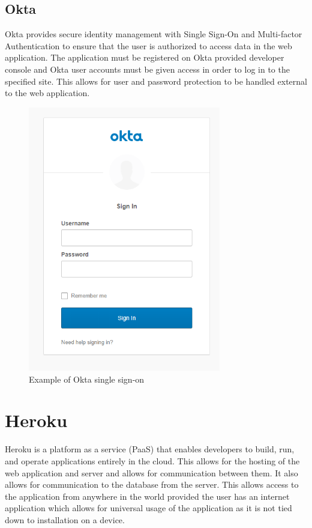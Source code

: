 \subsection{Okta}
Okta provides secure identity management with Single Sign-On and Multi-factor Authentication to ensure that the user is authorized to access data in the web application. The application must be registered on Okta provided developer console and Okta user accounts must be given access in order to log in to the specified site. This allows for user and password protection to be handled external to the web application.
\begin{figure}[h!]
 	\caption{Example of Okta single sign-on}
	\label{image:okta}
 	\centering
 	\includegraphics[width=0.75\textwidth]{Images/okta.PNG}
\end{figure}
\newpage
\section{Heroku}
Heroku is a platform as a service (PaaS) that enables developers to build, run, and operate applications entirely in the cloud. This allows for the hosting of the web application and server and allows for communication between them. It also allows for communication to the database from the server. This allows access to the application from anywhere in the world provided the user has an internet application which allows for universal usage of the application as it is not tied down to installation on a device. 

